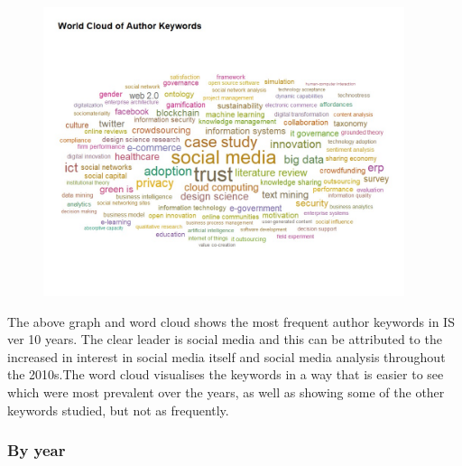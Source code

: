 \documentclass[
  letterpaper,
  DIV=11,
  numbers=noendperiod]{scrartcl}
\begin{document}
\begin{figure}

{\centering \includegraphics[width=4.16667in,height=\textheight]{images/top20mostfreqauthorkeywordsWordCloud-01.jpg}

}

\end{figure}

The above graph and word cloud shows the most frequent author keywords
in IS ver 10 years. The clear leader is social media and this can be
attributed to the increased in interest in social media itself and
social media analysis throughout the 2010s.The word cloud visualises the
keywords in a way that is easier to see which were most prevalent over
the years, as well as showing some of the other keywords studied, but
not as frequently.

\hypertarget{by-year}{%
\subsubsection{By year}\label{by-year}}
\end{document}
